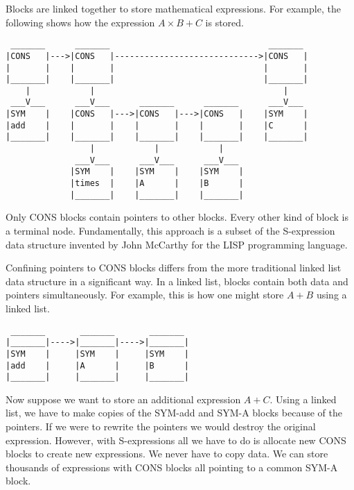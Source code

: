 \noindent
Blocks are linked together to store mathematical expressions.
For example, the following shows how the expression
$A\times B+C$ is stored.
\begin{verbatim}
 _______      _______                                _______
|CONS   |--->|CONS   |----------------------------->|CONS   |
|       |    |       |                              |       |
|_______|    |_______|                              |_______|
    |            |                                      |
 ___V___      ___V___      _______      _______      ___V___
|SYM    |    |CONS   |--->|CONS   |--->|CONS   |    |SYM    |
|add    |    |       |    |       |    |       |    |C      |
|_______|    |_______|    |_______|    |_______|    |_______|
                 |            |            |
              ___V___      ___V___      ___V___
             |SYM    |    |SYM    |    |SYM    |
             |times  |    |A      |    |B      |
             |_______|    |_______|    |_______|
\end{verbatim}

\bigskip
\noindent
Only CONS blocks contain pointers to other blocks.
Every other kind of block is a terminal node.
Fundamentally, this approach is a subset of the S-expression data structure
invented by John McCarthy for the LISP programming language.

\newpage

\noindent
Confining pointers to CONS blocks differs from the more traditional linked
list data structure in a significant way.
In a linked list, blocks contain both data and pointers simultaneously.
For example, this is how one might store $A+B$ using a linked list.
\begin{verbatim}
 _______       _______       _______
|_______|---->|_______|---->|_______|
|SYM    |     |SYM    |     |SYM    |
|add    |     |A      |     |B      |
|_______|     |_______|     |_______|
\end{verbatim}

\bigskip
\noindent
Now suppose we want to store an additional expression $A+C$.
Using a linked list, we have to make copies of the SYM-add and
SYM-A blocks
because of the pointers.
If we were to rewrite the pointers we would destroy the original
expression.
However, with S-expressions all we have to do is allocate new CONS
blocks to create new expressions.
We never have to copy data.
We can store thousands of expressions with CONS
blocks all pointing to a common SYM-A block.

\newpage

